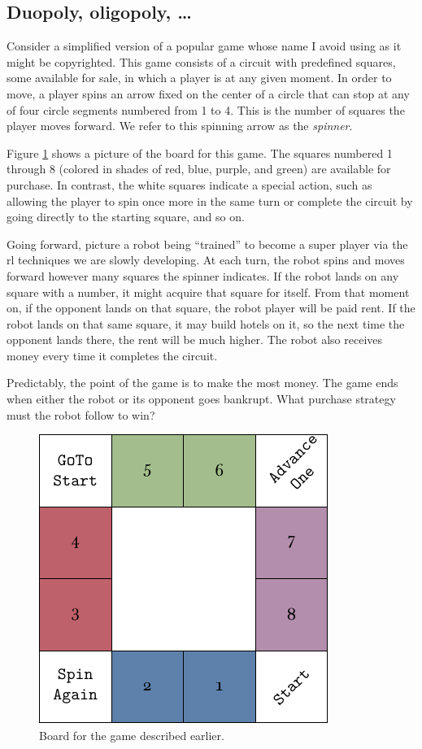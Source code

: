 \subsection{Duopoly, oligopoly, \ldots}

Consider a simplified version of a popular game whose name I avoid using as it
might be copyrighted. This game consists of a circuit with predefined squares,
some available for sale, in which a player is at any given moment. In order to
move, a player spins an arrow fixed on the center of a circle that can stop at
any of four circle segments numbered from 1 to 4. This is the number of squares
the player moves forward. We refer to this spinning arrow as the
\textit{spinner}.

Figure \ref{fig:miniopoly-board} shows a picture of the board for this game. The
squares numbered 1 through 8 (colored in shades of red, blue, purple, and green)
are available for purchase. In contrast, the white squares indicate a special
action, such as allowing the player to spin once more in the same turn or
complete the circuit by going directly to the starting square, and so on.

Going forward, picture a robot being ``trained'' to become a super player via
the \ac{rl} techniques we are slowly developing. At each turn, the robot spins
and moves forward however many squares the spinner indicates. If the robot lands
on any square with a number, it might acquire that square for itself. From that
moment on, if the opponent lands on that square, the robot player will be paid
rent. If the robot lands on that same square, it may build hotels on it, so the
next time the opponent lands there, the rent will be much higher. The robot also
receives money every time it completes the circuit.

Predictably, the point of the game is to make the most money. The game ends when
either the robot or its opponent goes bankrupt. What purchase strategy must the
robot follow to win?
\begin{figure}[h]
	\centering
	\includegraphics[width=.65\textwidth]{img/board.pdf}
	\caption{Board for the game described earlier.}
	\label{fig:miniopoly-board}
\end{figure}

